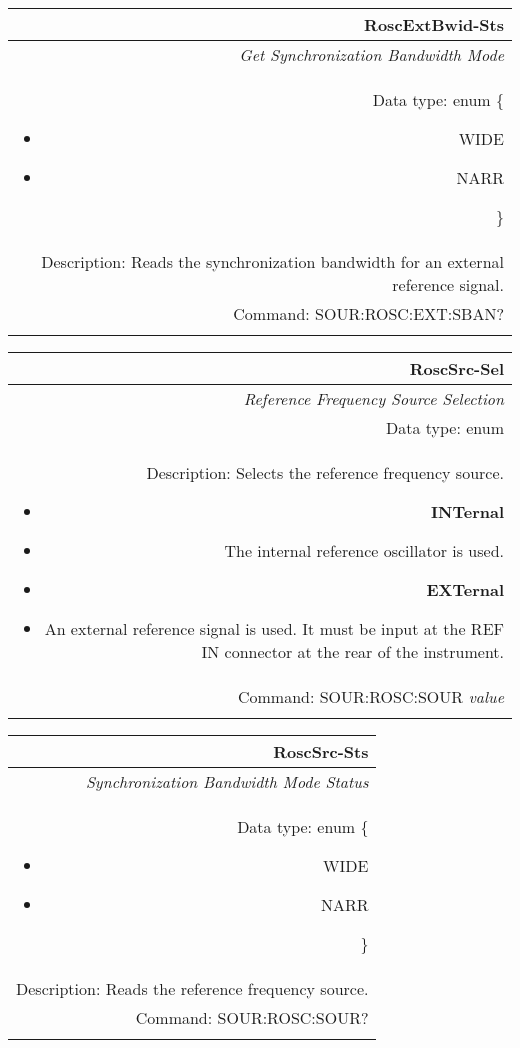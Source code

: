 \documentclass[openany]{article}
\begin{document}
		\begin{tabular}{N}
			\hline
			\bfseries RoscExtBwid-Sts \\ \hline
			\emph{Get Synchronization Bandwidth Mode} \\
			Data type: enum \{\begin{itemize}[noitemsep]
				\small
				\item[] WIDE
				\item[] NARR
			\end{itemize}\} \\ 
			Description: Reads the synchronization bandwidth for an external reference signal. \\
			Command: SOUR:ROSC:EXT:SBAN? \\
			\\

		\end{tabular}


		\begin{tabular}{N}
			\hline
			\bfseries RoscSrc-Sel \\ \hline
			\emph{Reference Frequency Source Selection} \\
			Data type: enum \\   
			Description: Selects the reference frequency source.\begin{itemize}[noitemsep]
				\small
				\item[] \textbf{INTernal}
				\item[] The internal reference oscillator is used.
                                \item[] \textbf{EXTernal}
				\item[] An external reference signal is used. It must be input at the REF IN connector at the rear of the instrument.
			\end{itemize} \\
			Command: SOUR:ROSC:SOUR \emph{value} \\
			\\

		\end{tabular}


		\begin{tabular}{N}
			\hline
			\bfseries RoscSrc-Sts \\ \hline
			\emph{Synchronization Bandwidth Mode Status} \\
			Data type: enum \{\begin{itemize}[noitemsep]
				\small
				\item[] WIDE
				\item[] NARR
			\end{itemize}\} \\ 
			Description: Reads the reference frequency source. \\
			Command: SOUR:ROSC:SOUR? \\
			\\

		\end{tabular}
\end{document}
